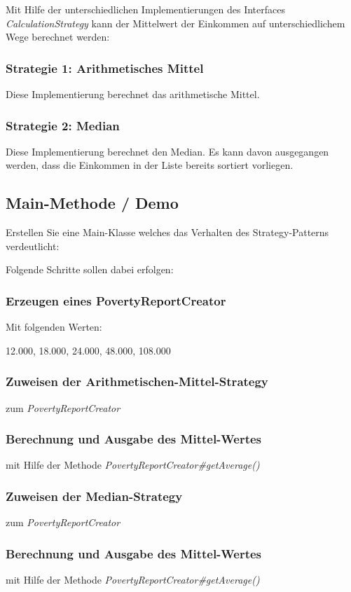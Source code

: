 \documentclass[oneside,a4paper]{scrartcl}
\begin{document}
Mit Hilfe der unterschiedlichen Implementierungen des Interfaces \emph{CalculationStrategy}
kann der Mittelwert der Einkommen auf unterschiedlichem Wege berechnet werden:


\subsubsection{Strategie 1: Arithmetisches Mittel}
Diese Implementierung berechnet das arithmetische Mittel.

\subsubsection{Strategie 2: Median}
Diese Implementierung berechnet den Median.
Es kann davon ausgegangen werden, dass die Einkommen in der Liste bereits sortiert vorliegen.

\subsection{Main-Methode / Demo}
Erstellen Sie eine Main-Klasse welches das Verhalten des Strategy-Patterns verdeutlicht:

\noindent Folgende Schritte sollen dabei erfolgen:


\subsubsection{Erzeugen eines PovertyReportCreator}

Mit folgenden Werten:

12.000,
18.000,
24.000,
48.000,
108.000

\subsubsection{Zuweisen der Arithmetischen-Mittel-Strategy}
zum \emph{PovertyReportCreator}

\subsubsection{Berechnung und Ausgabe des Mittel-Wertes}
mit Hilfe der Methode \emph{PovertyReportCreator\#getAverage()}

\subsubsection{Zuweisen der Median-Strategy}
zum \emph{PovertyReportCreator}

\subsubsection{Berechnung und Ausgabe des Mittel-Wertes}
mit Hilfe der Methode \emph{PovertyReportCreator\#getAverage()}
\end{document}
